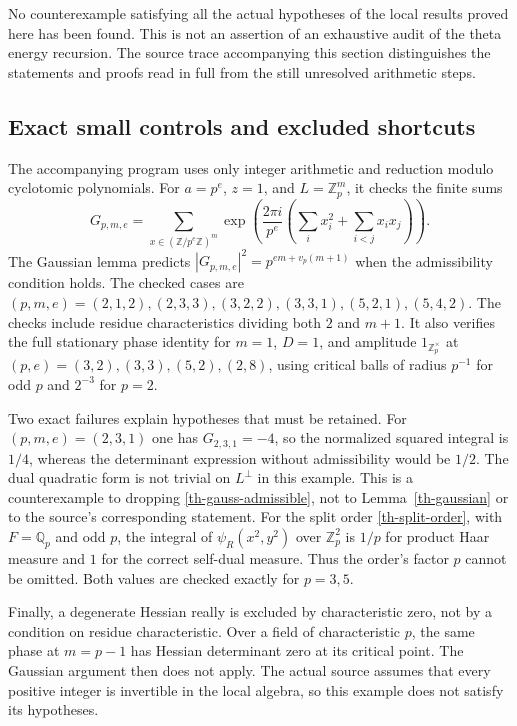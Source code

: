 No counterexample satisfying all the actual hypotheses of the local
results proved here has been found.  This is not an assertion of an
exhaustive audit of the theta energy recursion.  The source trace
accompanying this section distinguishes the statements and proofs
read in full from the still unresolved arithmetic steps.

\subsection{Exact small controls and excluded shortcuts}

The accompanying program uses only integer arithmetic and reduction
modulo cyclotomic polynomials.  For $a=p^e$, $z=1$, and
$L=\mathbb Z_p^m$, it checks the finite sums
\[
 G_{p,m,e}=\sum_{x\in(\mathbb Z/p^e\mathbb Z)^m}
 \exp\left(\frac{2\pi i}{p^e}
       \left(\sum_i x_i^2+\sum_{i<j}x_ix_j\right)\right).
\]
The Gaussian lemma predicts
$|G_{p,m,e}|^2=p^{em+v_p(m+1)}$ when the admissibility condition
holds.  The checked cases are
$(p,m,e)=(2,1,2),(2,3,3),(3,2,2),(3,3,1),(5,2,1),(5,4,2)$.
The checks include residue characteristics dividing both $2$ and
$m+1$.  It also verifies the full stationary phase identity for
$m=1$, $D=1$, and amplitude $1_{\mathbb Z_p^\times}$ at
$(p,e)=(3,2),(3,3),(5,2),(2,8)$, using critical balls of radius
$p^{-1}$ for odd $p$ and $2^{-3}$ for $p=2$.

Two exact failures explain hypotheses that must be retained.
For $(p,m,e)=(2,3,1)$ one has $G_{2,3,1}=-4$, so the normalized
squared integral is $1/4$, whereas the determinant expression
without admissibility would be $1/2$.  The dual quadratic form is
not trivial on $L^\perp$ in this example.  This is a counterexample
to dropping \eqref{th-gauss-admissible}, not to
Lemma~\ref{th-gaussian} or to the source's corresponding statement.
For the split order \eqref{th-split-order}, with $F=\mathbb Q_p$
and odd $p$, the integral of $\psi_R(x^2,y^2)$ over
$\mathbb Z_p^2$ is $1/p$ for product Haar measure and $1$ for the
correct self-dual measure.  Thus the order's factor $p$ cannot be
omitted.  Both values are checked exactly for $p=3,5$.

Finally, a degenerate Hessian really is excluded by characteristic
zero, not by a condition on residue characteristic.  Over a field
of characteristic $p$, the same phase at $m=p-1$ has Hessian
determinant zero at its critical point.  The Gaussian argument then
does not apply.  The actual source assumes that every positive
integer is invertible in the local algebra, so this example does
not satisfy its hypotheses.



